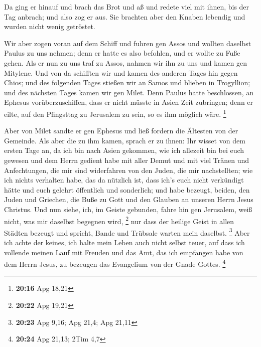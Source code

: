  Da ging er hinauf und brach das Brot und aß und redete
viel mit ihnen, bis der Tag anbrach; und also zog er aus.
 Sie brachten aber den Knaben lebendig und wurden nicht
wenig getröstet.

 Wir aber zogen voran auf dem Schiff und fuhren gen Assos
und wollten daselbst Paulus zu uns nehmen; denn er hatte es also
befohlen, und er wollte zu Fuße gehen.  Als er nun zu uns
traf zu Assos, nahmen wir ihn zu uns und kamen gen Mitylene.
 Und von da schifften wir und kamen des anderen Tages hin
gegen Chios; und des folgenden Tages stießen wir an Samos und blieben in
Trogyllion; und des nächsten Tages kamen wir gen Milet. 
Denn Paulus hatte beschlossen, an Ephesus vorüberzuschiffen, dass er
nicht müsste in Asien Zeit zubringen; denn er eilte, auf den Pfingsttag
zu Jerusalem zu sein, so es ihm möglich wäre. \footnote{\textbf{20:16}
  Apg 18,21}

 Aber von Milet sandte er gen Ephesus und ließ fordern
die Ältesten von der Gemeinde.  Als aber die zu ihm
kamen, sprach er zu ihnen: Ihr wisset von dem ersten Tage an, da ich bin
nach Asien gekommen, wie ich allezeit bin bei euch gewesen
 und dem Herrn gedient habe mit aller Demut und mit viel
Tränen und Anfechtungen, die mir sind widerfahren von den Juden, die mir
nachstellten;  wie ich nichts verhalten habe, das da
nützlich ist, dass ich's euch nicht verkündigt hätte und euch gelehrt
öffentlich und sonderlich;  und habe bezeugt, beiden, den
Juden und Griechen, die Buße zu Gott und den Glauben an unseren Herrn
Jesus Christus.  Und nun siehe, ich, im Geiste gebunden,
fahre hin gen Jerusalem, weiß nicht, was mir daselbst begegnen wird,
\footnote{\textbf{20:22} Apg 19,21}  nur dass der heilige
Geist in allen Städten bezeugt und spricht, Bande und Trübsale warten
mein daselbst. \footnote{\textbf{20:23} Apg 9,16; Apg 21,4; Apg 21,11}
 Aber ich achte der keines, ich halte mein Leben auch
nicht selbst teuer, auf dass ich vollende meinen Lauf mit Freuden und
das Amt, das ich empfangen habe von dem Herrn Jesus, zu bezeugen das
Evangelium von der Gnade Gottes. \footnote{\textbf{20:24} Apg 21,13;
  2Tim 4,7}

